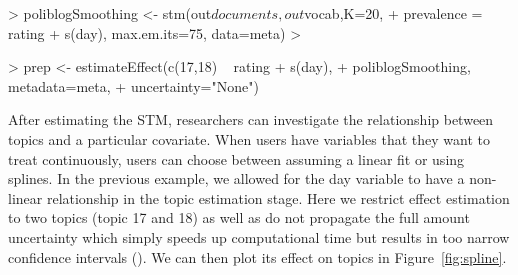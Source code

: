 \documentclass[nojss]{jss}
\begin{document}
\begin{Schunk}
\begin{Sinput}
> poliblogSmoothing <- stm(out$documents,out$vocab,K=20,
+         prevalence =~ rating + s(day), max.em.its=75, data=meta)
> 
\end{Sinput}
\end{Schunk}

\begin{Schunk}
\begin{Sinput}
> prep <- estimateEffect(c(17,18) ~ rating + s(day), 
+                        poliblogSmoothing, metadata=meta, 
+                        uncertainty="None")
\end{Sinput}
\end{Schunk}

After estimating the STM, researchers can investigate the relationship between topics and a particular covariate. When users have variables that they want to treat continuously, users can choose between assuming a linear fit or using splines. In the previous example, we allowed for the day variable to have a non-linear relationship in the topic estimation stage. Here we restrict effect estimation to two topics (topic 17 and 18) as well as do not propagate the full amount uncertainty which simply speeds up computational time but results in too narrow confidence intervals (). We can then plot its effect on topics in Figure~\ref{fig:spline}.
\end{document}
